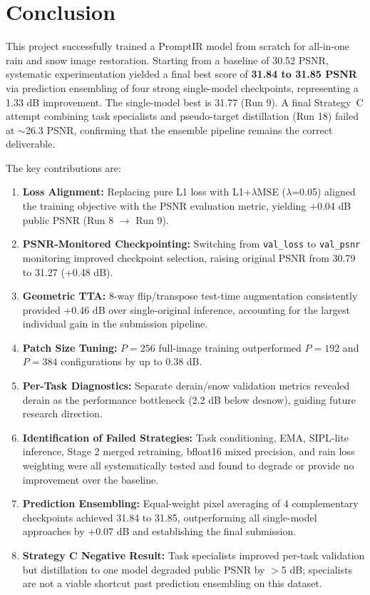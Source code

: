 \documentclass[12pt, a4paper]{article}
\begin{document}
\section{Conclusion}

This project successfully trained a PromptIR model from scratch for all-in-one rain and snow image restoration. Starting from a baseline of 30.52 PSNR, systematic experimentation yielded a final best score of \textbf{31.84 to 31.85 PSNR} via prediction ensembling of four strong single-model checkpoints, representing a 1.33 dB improvement. The single-model best is 31.77 (Run 9). A final Strategy~C attempt combining task specialists and pseudo-target distillation (Run 18) failed at $\sim$26.3 PSNR, confirming that the ensemble pipeline remains the correct deliverable.

The key contributions are:
\begin{enumerate}
    \item \textbf{Loss Alignment:} Replacing pure L1 loss with L1+$\lambda$MSE ($\lambda$=0.05) aligned the training objective with the PSNR evaluation metric, yielding +0.04 dB public PSNR (Run 8 $\rightarrow$ Run 9).
    \item \textbf{PSNR-Monitored Checkpointing:} Switching from \texttt{val\_loss} to \texttt{val\_psnr} monitoring improved checkpoint selection, raising original PSNR from 30.79 to 31.27 (+0.48 dB).
    \item \textbf{Geometric TTA:} 8-way flip/transpose test-time augmentation consistently provided +0.46 dB over single-original inference, accounting for the largest individual gain in the submission pipeline.
    \item \textbf{Patch Size Tuning:} $P=256$ full-image training outperformed $P=192$ and $P=384$ configurations by up to 0.38 dB.
    \item \textbf{Per-Task Diagnostics:} Separate derain/snow validation metrics revealed derain as the performance bottleneck (2.2 dB below desnow), guiding future research direction.
    \item \textbf{Identification of Failed Strategies:} Task conditioning, EMA, SIPL-lite inference, Stage 2 merged retraining, bfloat16 mixed precision, and rain loss weighting were all systematically tested and found to degrade or provide no improvement over the baseline.
    \item \textbf{Prediction Ensembling:} Equal-weight pixel averaging of 4 complementary checkpoints achieved 31.84 to 31.85, outperforming all single-model approaches by +0.07 dB and establishing the final submission.
    \item \textbf{Strategy C Negative Result:} Task specialists improved per-task validation but distillation to one model degraded public PSNR by $>$5 dB; specialists are not a viable shortcut past prediction ensembling on this dataset.
\end{enumerate}
\end{document}

